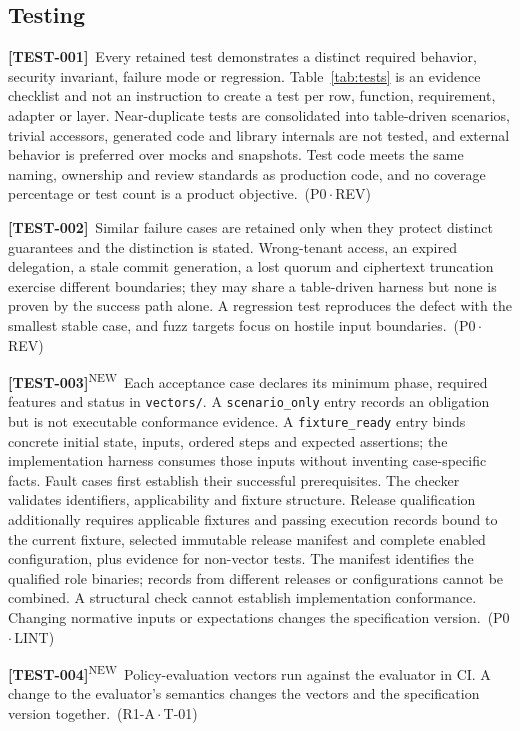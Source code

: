 \documentclass[11pt,a4paper]{article}
\newcommand{\code}[1]{{\small\nolinkurl{#1}}}
\newcommand{\reqtag}[2]{{\footnotesize\color{accent}(#1\,$\cdot$\,#2)}}
\newcommand{\req}[4]{\par\noindent\hypertarget{req:#1}{\textbf{[#1]}}\ #4\ \reqtag{#2}{#3}\par}
\newcommand{\reqn}[4]{\par\noindent\hypertarget{req:#1}{\textbf{[#1]}}\textsuperscript{\color{accent}\tiny NEW}\ #4\ \reqtag{#2}{#3}\par}
\begin{document}
\subsection{Testing}\label{sec:testing}
\req{TEST-001}{P0}{REV}{Every retained test demonstrates a distinct required behavior, security invariant, failure mode or regression. Table~\ref{tab:tests} is an evidence checklist and not an instruction to create a test per row, function, requirement, adapter or layer. Near-duplicate tests are consolidated into table-driven scenarios, trivial accessors, generated code and library internals are not tested, and external behavior is preferred over mocks and snapshots. Test code meets the same naming, ownership and review standards as production code, and no coverage percentage or test count is a product objective.}
\req{TEST-002}{P0}{REV}{Similar failure cases are retained only when they protect distinct guarantees and the distinction is stated. Wrong-tenant access, an expired delegation, a stale commit generation, a lost quorum and ciphertext truncation exercise different boundaries; they may share a table-driven harness but none is proven by the success path alone. A regression test reproduces the defect with the smallest stable case, and fuzz targets focus on hostile input boundaries.}
\reqn{TEST-003}{P0}{LINT}{Each acceptance case declares its minimum phase, required features and status in \texttt{vectors/}. A \code{scenario_only} entry records an obligation but is not executable conformance evidence. A \code{fixture_ready} entry binds concrete initial state, inputs, ordered steps and expected assertions; the implementation harness consumes those inputs without inventing case-specific facts. Fault cases first establish their successful prerequisites. The checker validates identifiers, applicability and fixture structure. Release qualification additionally requires applicable fixtures and passing execution records bound to the current fixture, selected immutable release manifest and complete enabled configuration, plus evidence for non-vector tests. The manifest identifies the qualified role binaries; records from different releases or configurations cannot be combined. A structural check cannot establish implementation conformance. Changing normative inputs or expectations changes the specification version.}
\reqn{TEST-004}{R1-A}{T-01}{Policy-evaluation vectors run against the evaluator in CI. A change to the evaluator's semantics changes the vectors and the specification version together.}
\end{document}
